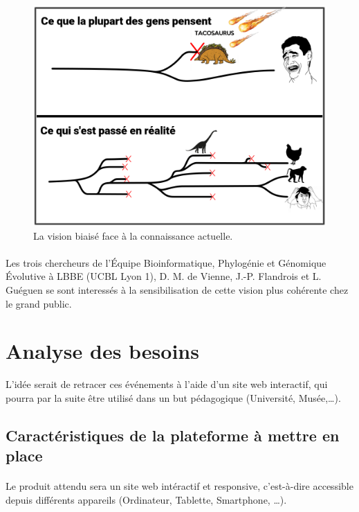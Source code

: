 \documentclass[a4paper]{article}
\begin{document}
	\begin{figure}[!h]
		\centering
		\includegraphics[width=12cm]{illustr1.png}
		\caption{La vision biaisé face à la connaissance actuelle.}
		\label{comic1}
	\end{figure}

	\paragraph{}
	Les trois chercheurs de l'Équipe Bioinformatique, Phylogénie et Génomique Évolutive à LBBE (UCBL Lyon 1), D. M. de Vienne, J.-P. Flandrois et L. Guéguen se sont interessés à la sensibilisation de cette vision plus cohérente chez le grand public.

\section{Analyse des besoins}

	L'idée serait de retracer ces événements à l'aide d'un site web interactif, qui pourra par la suite être utilisé dans un but pédagogique (Université, Musée,\ldots).

	\subsection{Caractéristiques de la plateforme à mettre en place}
		\paragraph{}
		Le produit attendu sera un site web intéractif et responsive, c'est-à-dire accessible depuis différents appareils (Ordinateur, Tablette, Smartphone, \ldots).
		
\end{document}
